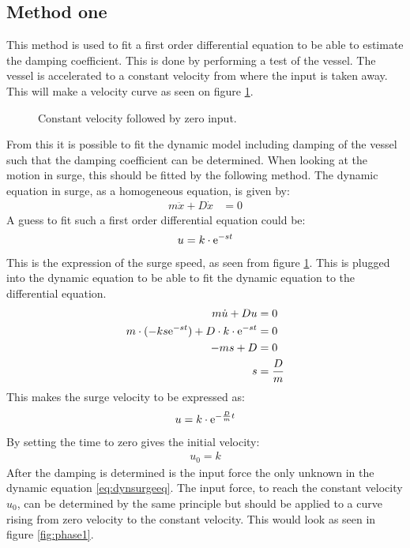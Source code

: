 \subsection{Method one}
\label{subsec:methodone}
This method is used to fit a first order differential equation to be able to estimate the damping coefficient. This is done by performing a test of the vessel. The vessel is accelerated to a constant velocity from where the input is taken away. This will make a velocity curve as seen on figure \ref{fig:phase3}.
\begin{figure}[htbp]
	\centering
	
	\caption{Constant velocity followed by zero input.}
	\label{fig:phase3}
\end{figure}
From this it is possible to fit the dynamic model including damping of the vessel such that the damping coefficient can be determined. When looking at the motion in surge, this should be fitted by the following method. The dynamic equation in surge, as a homogeneous equation, is given by:
\begin{align}
m \ddot x + D \dot x &= 0
\label{eq:dynsurgeeq}
\end{align}
A guess to fit such a first order differential equation could be:
\begin{align}
u = k \cdot \mathrm{e}^{-st}
\end{align}
This is the expression of the surge speed, as seen from figure \ref{fig:phase3}. This is plugged into the dynamic equation to be able to fit the dynamic equation to the differential equation.
\begin{align}
m \dot u + Du &= 0\\
m \cdot (-ks\mathrm{e}^{-st}) + D \cdot k \cdot \mathrm{e}^{-st} &= 0\\
-ms+D&=0\\
s&=\frac{D}{m}
\end{align}
This makes the surge velocity to be expressed as:
\begin{align}
u = k \cdot \mathrm{e}^{-\frac{D}{m}t}
\end{align}
By setting the time to zero gives the initial velocity:
\begin{align}
u_0 = k
\end{align}
After the damping is determined is the input force the only unknown in the dynamic equation \eqref{eq:dynsurgeeq}. The input force, to reach the constant velocity $u_0$, can be determined by the same principle but should be applied to a curve rising from zero velocity to the constant velocity. This would look as seen in figure \ref{fig:phase1}.
